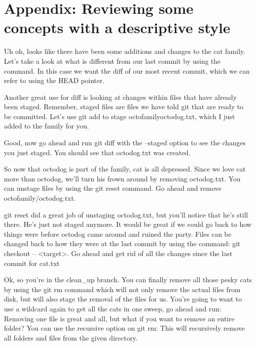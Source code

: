 \section{Appendix: Reviewing some concepts with a descriptive style} \label{app:details}
\nl {}
\nl Uh oh, looks like there have been some additions and changes to the cat family. Let's take a look at what is different from our last commit by using the  command. In this case we want the diff of our most recent commit, which we can refer to using the HEAD pointer.
\nl{}

\bigskip
\nl {}
\nl Another great use for diff is looking at changes within files that have already been staged. Remember, staged files are files we have told git that are ready to be committed. Let's use git add to stage octofamily\/octodog.txt, which I just added to the family for you.
\nl{}

\nl Good, now go ahead and run git diff with the --staged option to see the changes you just staged. You should see that octodog.txt was created.
\nl {}

\bigskip
\nl {}
\nl So now that octodog is part of the family, cat is all depressed. Since we love cat more than octodog, we'll turn his frown around by removing octodog.txt.
\nl You can unstage files by using the git reset command. Go ahead and remove octofamily/octodog.txt.
\nl{}

\bigskip
\nl {}
\nl git reset did a great job of unstaging octodog.txt, but you'll notice that he's still there. He's just not staged anymore. It would be great if we could go back to how things were before octodog came around and ruined the party.
\nl Files can be changed back to how they were at the last commit by using the command: git checkout -- <target>. Go ahead and get rid of all the changes since the last commit for cat.txt
\nl {}

\bigskip
\nl {}
\nl Ok, so you're in the clean\_up branch. You can finally remove all those pesky cats by using the git rm command which will not only remove the actual files from disk, but will also stage the removal of the files for us.
\nl You're going to want to use a wildcard again to get all the cats in one sweep, go ahead and run:
\nl{}
\nl Removing one file is great and all, but what if you want to remove an entire folder? You can use the recursive option on git rm: 
\nl {} 
\nl This will recursively remove all folders and files from the given directory.


